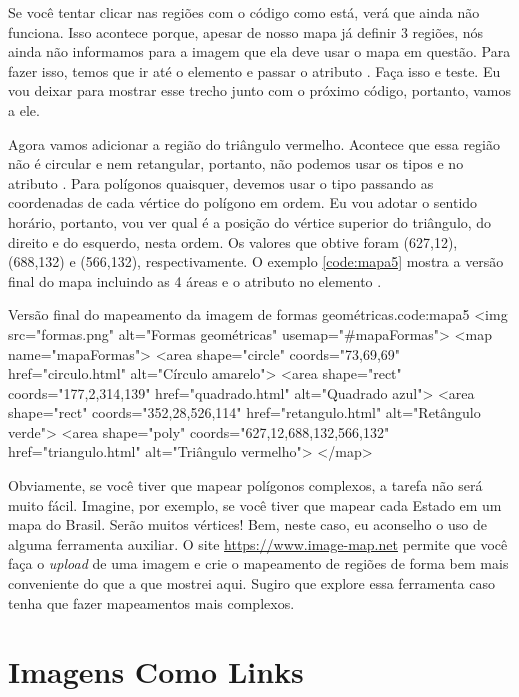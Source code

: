 Se você tentar clicar nas regiões com o código como está, verá que ainda não funciona. Isso acontece porque, apesar de nosso mapa já definir 3 regiões, nós ainda não informamos para a imagem que ela deve usar o mapa em questão. Para fazer isso, temos que ir até o elemento  e passar o atributo . Faça isso e teste. Eu vou deixar para mostrar esse trecho junto com o próximo código, portanto, vamos a ele.

Agora vamos adicionar a região do triângulo vermelho. Acontece que essa região não é circular e nem retangular, portanto, não podemos usar os tipos  e  no atributo . Para polígonos quaisquer, devemos usar o tipo  passando as coordenadas de cada vértice do polígono em ordem. Eu vou adotar o sentido horário, portanto, vou ver qual é a posição do vértice superior do triângulo, do direito e do esquerdo, nesta ordem. Os valores que obtive foram (627,12), (688,132) e (566,132), respectivamente. O exemplo \ref{code:mapa5} mostra a versão final do mapa incluindo as 4 áreas e o atributo  no elemento .

\begin{htmlcode}{Versão final do mapeamento da imagem de formas geométricas.}{code:mapa5}
<img src="formas.png" alt="Formas geométricas" usemap="#mapaFormas">
<map name="mapaFormas">
    <area shape="circle" coords="73,69,69" href="circulo.html" alt="Círculo amarelo">
    <area shape="rect" coords="177,2,314,139" href="quadrado.html" alt="Quadrado azul">
    <area shape="rect" coords="352,28,526,114" href="retangulo.html" alt="Retângulo verde">
    <area shape="poly" coords="627,12,688,132,566,132" href="triangulo.html" alt="Triângulo vermelho">
</map>
\end{htmlcode}

Obviamente, se você tiver que mapear polígonos complexos, a tarefa não será muito fácil. Imagine, por exemplo, se você tiver que mapear cada Estado em um mapa do Brasil. Serão muitos vértices! Bem, neste caso, eu aconselho o uso de alguma ferramenta auxiliar. O site \url{https://www.image-map.net} permite que você faça o \textit{upload} de uma imagem e crie o mapeamento de regiões de forma bem mais conveniente do que a que mostrei aqui. Sugiro que explore essa ferramenta caso tenha que fazer mapeamentos mais complexos.

\section{Imagens Como Links}

